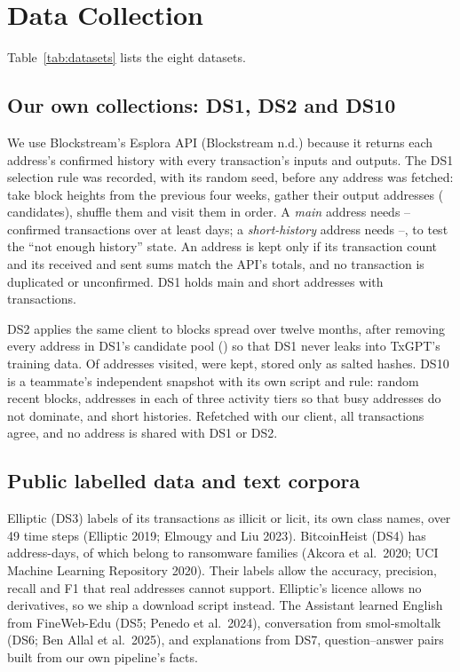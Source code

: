 \section{Data Collection}
\label{sec:collection}

Table~\ref{tab:datasets} lists the eight datasets.



\subsection{Our own collections: DS1, DS2 and DS10}

We use Blockstream's Esplora API (Blockstream n.d.) because it returns each address's confirmed history with every
transaction's inputs and outputs. The DS1 selection rule was recorded, with its random seed, before any address
was fetched: take  block heights from the previous four weeks, gather their output addresses
( candidates), shuffle them and visit them in order. A \emph{main} address needs -- confirmed transactions over at
least  days; a \emph{short-history} address needs --,
to test the ``not enough history'' state. An address is kept only if its transaction count
and its received and sent sums match the API's totals, and no transaction is duplicated or unconfirmed. DS1 holds
 main and  short addresses with  transactions.

DS2 applies the same client to  blocks spread over twelve months, after removing every address in
DS1's candidate pool () so that DS1 never leaks into TxGPT's training data. Of
 addresses visited,  were kept, stored only as salted hashes. DS10 is a teammate's
independent snapshot with its own script and rule:  random recent blocks,
 addresses in each of three activity tiers so that busy addresses do not dominate, and
 short histories. Refetched with our client, all  transactions agree, and no address is
shared with DS1 or DS2.

\subsection{Public labelled data and text corpora}

Elliptic (DS3) labels  of its  transactions as illicit or licit, its own class
names, over 49 time steps (Elliptic 2019; Elmougy and Liu 2023). BitcoinHeist (DS4) has 
address-days, of which  belong to ransomware families (Akcora et al.\ 2020; UCI Machine Learning
Repository 2020). Their labels allow the accuracy, precision, recall and F1 that real addresses cannot support.
Elliptic's licence allows no derivatives, so we ship a download script instead. The Assistant learned English from FineWeb-Edu (DS5; Penedo et al.\ 2024), conversation from
smol-smoltalk (DS6; Ben Allal et al.\ 2025), and explanations from DS7, question--answer pairs built from our own
pipeline's facts.

